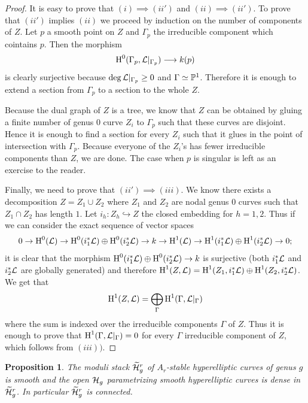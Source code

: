 \documentclass{alggeom}
\numberwithin{equation}{section}
\numberwithin{subsection}{section}
\newtheorem{proposition}[theorem]{Proposition}
\theoremstyle{definition}
\theoremstyle{remark}
\renewcommand\H{\operatorname{H}}
\newcommand{\Htilde}{\widetilde{\cH}}
\begin{document}
\begin{proof}
	It is easy to prove that $(i) \implies(ii')$ and $(ii)\implies (ii')$. To prove that $(ii')$ implies $(ii)$ we proceed by induction on the number of components of $Z$. Let $p$ a smooth point on $Z$ and $\Gamma_p$ the irreducible component which cointains $p$. Then the morphism $$\H^0(\Gamma_p,\cL\vert_{\Gamma_p})\longrightarrow k(p)$$ is clearly surjective because $\deg \mathcal{L}\vert_{\Gamma_p}\geq 0$ and $\Gamma \simeq \mathbb{P}^1$. Therefore it is enough to extend a section from $\Gamma_p$ to a section to the whole $Z$. 
	
	Because the dual graph of $Z$ is a tree, we know that $Z$ can be obtained by gluing a finite number of genus $0$ curve $Z_i$ to $\Gamma_p$ such that these curves are disjoint. Hence it is enough to find a section for every $Z_i$ such that it glues in the point of intersection with $\Gamma_p$. Because everyone of the $Z_i$'s has fewer irreducible components than $Z$, we are done. The case when $p$ is singular is left as an exercise to the reader.  
	
	Finally, we need to prove that $(ii')\implies (iii)$. We know there exists a decomposition $Z=Z_1\cup Z_2$ where $Z_1$ and $Z_2$ are nodal genus $0$ curves such that $Z_1\cap Z_2$ has length $1$. Let $i_h:Z_h \hookrightarrow Z$ the closed embedding for $h=1,2$. Thus if we can consider the exact sequence of vector spaces 
	$$ 0\rightarrow \H^0(\cL)\rightarrow \H^0(i_1^*\cL)\oplus\H^0(i_2^*\cL) \rightarrow k \rightarrow \H^1(\cL) \rightarrow \H^1(i_1^*\cL)\oplus \H^1(i_2^*\cL) \rightarrow 0;$$  
	it is clear that the morphism $\H^0(i_1^*\cL)\oplus\H^0(i_2^*\cL) \rightarrow k$ is surjective (both $i_1^*\mathcal{L}$ and $i_2^*\mathcal{L}$ are globally generated) and therefore $\H^1(Z,\cL)=\H^1(Z_1,i_1^*\cL)\oplus \H^1(Z_2,i_2^*\cL)$. We get that 
	$$\H^1(Z,\cL)=\bigoplus_{\Gamma} \H^1(\Gamma, \cL\vert_{\Gamma})$$
	where the sum is indexed over the irreducible components $\Gamma$ of $Z$. Thus it is enough to prove that $\H^1(\Gamma,\cL\vert_{\Gamma})=0$ for every $\Gamma$ irreducible component of $Z$, which follows from $(iii))$.
\end{proof} 

\begin{proposition}\label{prop:smooth-hyp}
	The moduli stack $\Htilde_g^r$ of $A_r$-stable hyperelliptic curves of genus $g$ is smooth and the open $\mathcal{H}_g$ parametrizing smooth hyperelliptic curves is dense in $\Htilde_g^r$. In particular $\Htilde_g^r$ is connected.
\end{proposition}
\end{document}
